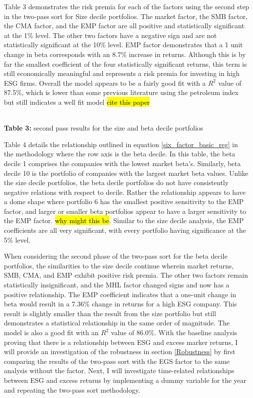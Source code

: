 Table 3 demonstrates the risk premia for each of the factors using the second step in the two-pass sort for Size decile portfolios. The market factor, the SMB factor, the CMA factor, and the EMP factor are all positive and statistically significant at the 1\% level. The other two factors have a negative sign and are not statistically significant at the 10\% level.  EMP factor demonstrates that a 1 unit change in beta corresponds with an 8.7\% increase in returns. Although this is by far the smallest coefficient of the four statistically significant returns, this term is still economically meaningful and represents a risk premia for investing in high ESG firms. Overall the model appears to be a fairly good fit with a $R^2$ value of 87.5\%, which is lower than some previous literature using the petroleum index but still indicates a well fit model \hl{cite this paper} 


\begin{center}
    \paperspacingnarrow
    \\
    \textbf{Table 3:} second pass results for the size and beta decile portfolios\\
    \paperspacingwide
\end{center}

Table 4 details the relationship outlined in equation \eqref{six_factor_basic_reg} in the methodology where the row axis is the beta decile. In this table,  the beta decile 1 comprises the companies with the lowest market beta's. Similarly, beta decile 10 is the portfolio of companies with the largest market beta values.  Unlike the size decile portfolios, the beta decile portfolios do not have consistently negative relations with respect to decile. Rather the relationship appears to have a dome shape where portfolio 6 has the smallest positive sensitivity to the EMP factor, and larger or smaller beta portfolios appear to have a larger sensitivity to the  EMP factor. \hl{why might this be}. Similar to the size decile analysis, the EMP coefficients are all very significant, with every portfolio having significance at the 5\% level. 

When considering the second phase of the two-pass sort for the beta decile portfolios, the similarities to the size decile continue wherein market returns, SMB, CMA, and EMP exhibit positive risk premia. The other two factors remain statistically insignificant, and the MHL factor changed signs and now has a positive relationship. The EMP coefficient indicates that a one-unit change in beta would result in a 7.36\% change in returns for a high ESG company. This result is slightly smaller than the result from the size portfolio but still demonstrates a statistical relationship in the same order of magnitude. The model is also a good fit with an $R^2$ value of 86.0\%. With the baseline analysis proving that there is a relationship between ESG and excess marker returns, I will provide an investigation of the robustness in section \ref{Robustness} by first comparing the results of the two-pass sort with the EGS factor to the same analysis without the factor. Next, I will investigate time-related relationships between ESG and excess returns by implementing a dummy variable for the year and repeating the two-pass sort methodology.

